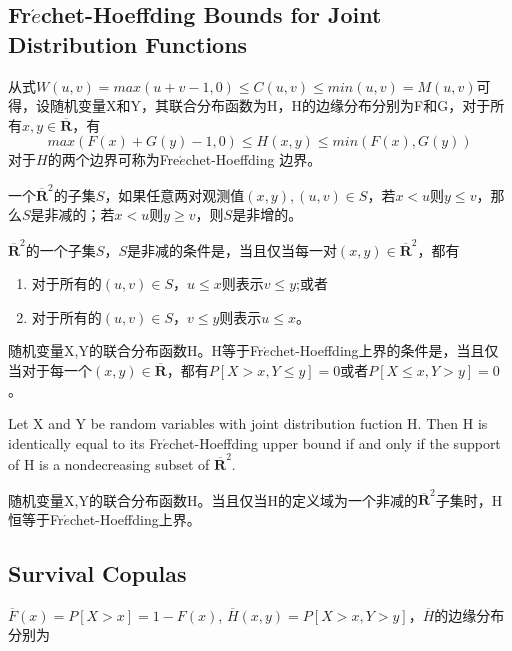 \subsection{Fr$\acute{e}$chet-Hoeffding Bounds for Joint Distribution Functions}
从式$W(u,v)=max(u+v-1,0)\leq C(u,v) \leq min(u,v)=M(u,v)$可得，设随机变量X和Y，其联合分布函数为H，H的边缘分布分别为F和G，对于所有$x,y \in \overline{\mathbf{R}}$，有
\begin{equation}
    max(F(x)+G(y)-1,0) \leq H(x,y) \leq min(F(x),G(y))
    \label{eq2.5.1}
\end{equation}
对于$H$的两个边界可称为Fre$\acute{e}$chet-Hoeffding 边界。
\begin{definition}
    一个$\overline{\mathbf{R}}^2$的子集$S$，如果任意两对观测值$(x,y),(u,v) \in S$，若$x<u$则$y\leq v$，那么$S$是非减的；若$x<u$则$y\geq v$，则$S$是非增的。
    \label{def-fh}
\end{definition}
\begin{lemma}
    $\overline{\mathbf{R}}^2$的一个子集$S$，$S$是非减的条件是，当且仅当每一对$(x,y) \in \overline{\mathbf{R}}^2$，都有
    \begin{enumerate}
        \item 对于所有的$(u,v) \in S$，$u\leq x$则表示$v\leq y$;或者
        \item 对于所有的$(u,v) \in S$，$v\leq y$则表示$u\leq x$。
    \end{enumerate}
    \label{lemma-fh1}
\end{lemma}
\begin{lemma}
    随机变量X,Y的联合分布函数H。H等于Fr$\acute{e}$chet-Hoeffding上界的条件是，当且仅当对于每一个$(x,y)\in\overline{\mathbf{R}}$，都有$P[X>x,Y\leq y] = 0$或者$P[X\leq x,Y>y]=0$。
    \label{lemma-fh2}
\end{lemma}
\begin{theorem}
    Let X and Y be random variables with joint distribution fuction H. Then H is identically equal to its Fr$\acute{e}$chet-Hoeffding upper bound if and only if the support of H is a nondecreasing subset of $\overline{\mathbf{R}}^2$.
    
    随机变量X,Y的联合分布函数H。当且仅当H的定义域为一个非减的$\overline{\mathbf{R}}^2$子集时，H恒等于Fr$\acute{e}$chet-Hoeffding上界。
    \label{thr-fhupper}
\end{theorem}


\subsection{Survival Copulas}
$\overline{F}(x) = P[X>x] = 1- F(x)$, $\overline{H}(x,y) = P[X>x,Y>y]$，$\overline{H}$的边缘分布分别为

